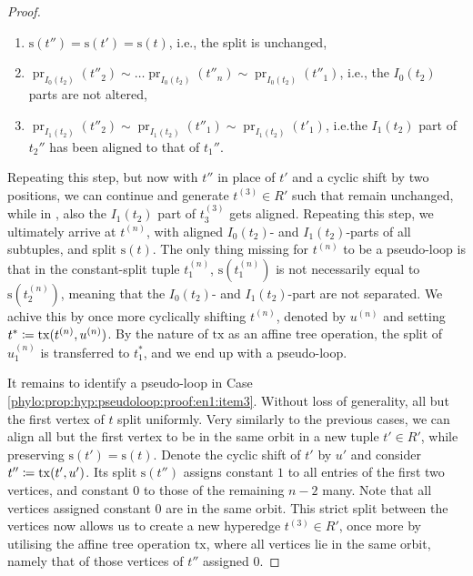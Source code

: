 \documentclass[a4paper,reqno, cleveref]{amsart}
\newcommand{\coloneqq}{\mathrel{\mathop:}\mathrel{\mkern-1.2mu}=}
\newcommand{\s}{\ensuremath{\mathrm{s}}\xspace}
\DeclareMathOperator{\pr}{pr}
\newcommand{\tx}{\ensuremath{\mathrm{tx}}\xspace}
\newcommand{\hyp}{\ensuremath{R}\xspace}
\begin{document}
\begin{proof}
    \begin{enumerate}
        \item\label{phylo:prop:hyp:pseudoloop:proof:en2:item1} $\s(t'')=\s(t')=\s(t)$, i.e., the split is unchanged, 
        \item\label{phylo:prop:hyp:pseudoloop:proof:en2:item2} $\pr_{I_0(t_2)}(t''_2)\sim\dots\pr_{I_0(t_2)}(t''_n)\sim\pr_{I_0(t_2)}(t''_1)$, i.e., the $I_0(t_2)$ parts are not altered,
        \item\label{phylo:prop:hyp:pseudoloop:proof:en2:item3} $\pr_{I_1(t_2)}(t''_2)\sim\pr_{I_1(t_2)}(t''_1)\sim \pr_{I_1(t_2)}(t'_1)$, i.e.\;the $I_1(t_2)$ part of $t_2''$ has been aligned to that of $t_1''$.
    \end{enumerate} 

    Repeating this step, but now with $t''$ in place of $t'$ and a cyclic shift by two positions, we can continue and generate $t^{(3)}\in\hyp'$ such that  remain unchanged, while in , also the $I_1(t_2)$ part of $t_3^{(3)}$ gets aligned. Repeating this step, we ultimately arrive at $t^{(n)}$, with aligned $I_0(t_2)$- and $I_1(t_2)$-parts of all subtuples, and split $\s(t)$. 
    The only thing missing for $t^{(n)}$ to be a pseudo-loop is that in the constant-split tuple $t^{(n)}_1$, $\s(t^{(n)}_1)$ is not necessarily equal to $\s(t^{(n)}_2)$, meaning that the $I_0(t_2)$- and $I_1(t_2)$-part are not separated. 
    We achive this by once more cyclically shifting $t^{(n)}$, denoted by $u^{(n)}$ and setting $t^*\coloneqq \tx(t^{(n)},u^{(n)})$. 
    By the nature of $\tx$ as an affine tree operation, the split of $u^{(n)}_1$ is transferred to $t^*_1$, and we end up with a pseudo-loop.

    It remains to identify a pseudo-loop in Case \ref{phylo:prop:hyp:pseudoloop:proof:en1:item3}.
    Without loss of generality, all but the first vertex of $t$ split uniformly. 
    Very similarly to the previous cases, we can align all but the first vertex to be in the same orbit in a new tuple $t'\in\hyp'$, while preserving $\s(t')=\s(t)$. 
    Denote the cyclic shift of $t'$ by $u'$ and consider $t''\coloneqq \tx(t',u')$. 
    Its split $\s(t'')$ assigns constant $1$ to all entries of the first two vertices, and constant $0$ to those of the remaining $n-2$ many. 
    Note that all vertices assigned constant $0$ are in the same orbit. 
    This strict split between the vertices now allows us to create a new hyperedge $t^{(3)}\in\hyp'$, once more by utilising the affine tree operation $\tx$, where all vertices lie in the same orbit, namely that of those vertices of $t''$ assigned $0$.
\end{proof}
\end{document}
